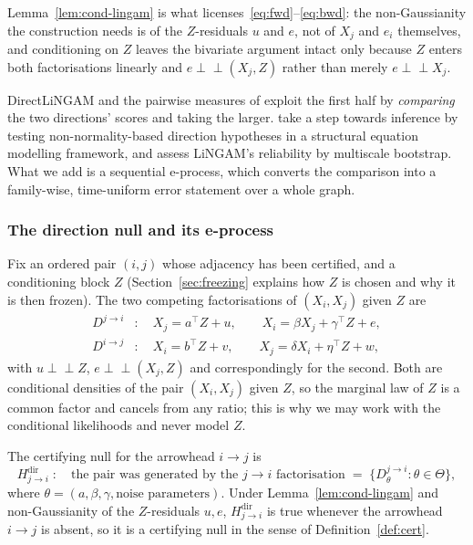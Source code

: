 \documentclass[pdflatex,sn-apa]{sn-jnl}
\theoremstyle{thmstyleone}%
\theoremstyle{thmstyletwo}%
\theoremstyle{thmstylethree}%
\newcommand{\indep}{\perp\!\!\!\perp}
\begin{document}
Lemma~\ref{lem:cond-lingam} is what licenses~\eqref{eq:fwd}--\eqref{eq:bwd}: the
non-Gaussianity the construction needs is of the $Z$-residuals $u$ and $e$, not
of $X_j$ and $e_i$ themselves, and conditioning on $Z$ leaves the bivariate
argument intact only because $Z$ enters both factorisations linearly and
$e \indep (X_j, Z)$ rather than merely $e \indep X_j$.

DirectLiNGAM \citep{shimizu2011directlingam} and the pairwise measures of
\citet{hyvarinen2013pairwise} exploit the first half by \emph{comparing} the
two directions' scores and taking the larger. \citet{shimizu2008use} take a
step towards inference by testing non-normality-based direction hypotheses in
a structural equation modelling framework, and \citet{komatsu2010assessing}
assess LiNGAM's reliability by multiscale bootstrap. What we add is a
sequential e-process, which converts the comparison into a family-wise,
time-uniform error statement over a whole graph.

\subsubsection{The direction null and its e-process}\label{sec:dirnull}

Fix an ordered pair $(i,j)$ whose adjacency has been certified, and a
conditioning block $Z$ (Section~\ref{sec:freezing} explains how $Z$ is chosen
and why it is then frozen). The two competing factorisations of $(X_i, X_j)$
given $Z$ are
\begin{align}
D^{j \to i} &: \quad X_j = a^\top Z + u, \qquad
                     X_i = \beta X_j + \gamma^\top Z + e, \label{eq:fwd}\\
D^{i \to j} &: \quad X_i = b^\top Z + v, \qquad
                     X_j = \delta X_i + \eta^\top Z + w, \label{eq:bwd}
\end{align}
with $u \indep Z$, $e \indep (X_j, Z)$ and correspondingly for the second.
Both are conditional densities of the pair $(X_i, X_j)$ given $Z$, so the
marginal law of $Z$ is a common factor and cancels from any ratio; this is why
we may work with the conditional likelihoods and never model $Z$.

The certifying null for the arrowhead $i \to j$ is
\begin{equation}\label{eq:dirnull}
H^{\mathrm{dir}}_{j \to i} \;:\quad
\text{the pair was generated by the } j \to i \text{ factorisation}
\;=\; \{D^{j\to i}_\theta : \theta \in \Theta\},
\end{equation}
where $\theta = (a, \beta, \gamma, \text{noise parameters})$. Under
Lemma~\ref{lem:cond-lingam} and non-Gaussianity of the $Z$-residuals $u, e$,
$H^{\mathrm{dir}}_{j \to i}$ is true whenever the arrowhead $i \to j$ is
absent, so it is a certifying null in the sense of Definition~\ref{def:cert}.
\end{document}
